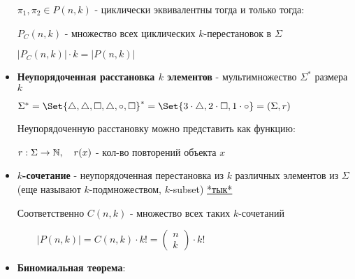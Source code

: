 \documentclass[12pt]{article}
\begin{document}
\begin{itemize}
\begin{minipage}{\linewidth}
\begin{wrapfigure}{r}{0pt}
            \end{wrapfigure}


            $\pi_1, \pi_2 \in P(n, k)$ - циклически эквивалентны тогда и только тогда:


            $P_C(n, k)$ - множество всех циклических $k$-перестановок в $\Sigma$

            $|P_C(n, k)| \cdot k = |P(n, k)|$


        \end{minipage}


        \item \textbf{Неупорядоченная расстановка $k$ элементов} - мультимножество $\Sigma^*$ размера $k$

        \Exs $\Sigma^* = \Set{\triangle, \triangle, \Box, \triangle, \circ, \Box}^* = \Set{3 \cdot \triangle, 2 \cdot \Box, 1 \cdot \circ} = (\Sigma, r)$

        Неупорядоченную расстановку можно представить как функцию:

        $r : \Sigma \to \mathbb{N}, \quad r(x)$ - кол-во повторений объекта $x$


        \item \textbf{$k$-сочетание} - неупорядоченная перестановка из $k$ различных элементов из $\Sigma$ (еще называют $k$-подмножеством, $k$-subset)
        \hfill\href{https://ru.wikipedia.org/wiki/%D0%A1%D0%BE%D1%87%D0%B5%D1%82%D0%B0%D0%BD%D0%B8%D0%B5}{*тык*}

        Соответственно $C(n, k)$ - множество всех таких $k$-сочетаний

        $\quad\quad |P(n, k)| = C(n, k) \cdot k! = \begin{pmatrix}n \\ k\end{pmatrix} \cdot k!$

        \item \Ths \textbf{Биномиальная теорема}:


\end{itemize}
\end{document}
